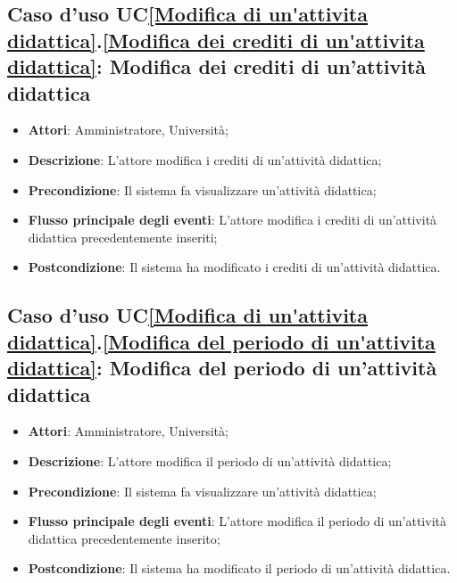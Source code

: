 \subsection{Caso d'uso UC\ref{Modifica di un'attivita didattica}.\ref{Modifica dei crediti di un'attivita didattica}: Modifica dei crediti di un'attività didattica}
\begin{itemize}
	\item \textbf{Attori}: Amministratore, Università;
	\item \textbf{Descrizione}: L'attore modifica i crediti di un'attività didattica;
	
	\item \textbf{Precondizione}: Il sistema fa visualizzare un'attività didattica;
	
	
	\item \textbf{Flusso principale degli eventi}: L'attore modifica i crediti di un'attività didattica precedentemente inseriti;
	
	\item \textbf{Postcondizione}: Il sistema ha modificato i crediti di un'attività didattica.
	
\end{itemize}

\subsection{Caso d'uso UC\ref{Modifica di un'attivita didattica}.\ref{Modifica del periodo di un'attivita didattica}: Modifica del periodo di un'attività didattica}
\begin{itemize}
	\item \textbf{Attori}: Amministratore, Università;
	\item \textbf{Descrizione}: L'attore modifica il periodo di un'attività didattica;
	
	\item \textbf{Precondizione}: Il sistema fa visualizzare un'attività didattica;
	
	
	\item \textbf{Flusso principale degli eventi}: L'attore modifica il periodo di un'attività didattica precedentemente inserito;
	
	\item \textbf{Postcondizione}: Il sistema ha modificato il periodo di un'attività didattica.
	
\end{itemize}

